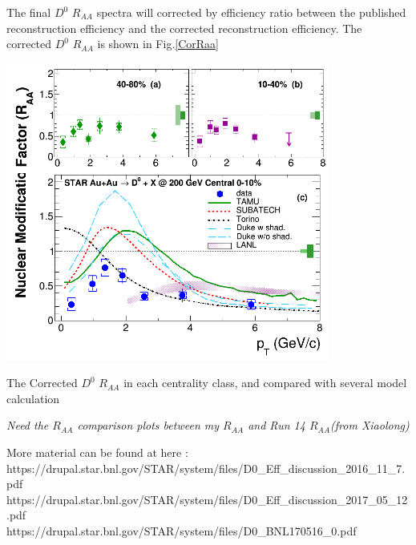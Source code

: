 

The final $D^0$ $R_{AA}$ spectra will corrected by efficiency ratio between the published reconstruction efficiency and the corrected reconstruction efficiency. The  corrected $D^0$ $R_{AA}$ is  shown in Fig.\ref{CorRaa}

\bfg \centering
\includegraphics[width=0.8\textwidth]{figure/Run11_YF/fig3.png}
\caption{The Corrected $D^0$ $R_{AA}$ in each centrality class, and compared with several model calculation }
\label{CorRaa}
\efg

\emph{Need the $R_{AA}$ comparison plots between my $R_{AA}$  and Run 14 $R_{AA}$(from Xiaolong) }

More material can be found at here :  
\\https://drupal.star.bnl.gov/STAR/system/files/D0\_Eff\_discussion\_2016\_11\_7.pdf
\\https://drupal.star.bnl.gov/STAR/system/files/D0\_Eff\_discussion\_2017\_05\_12.pdf
\\https://drupal.star.bnl.gov/STAR/system/files/D0\_BNL170516\_0.pdf




